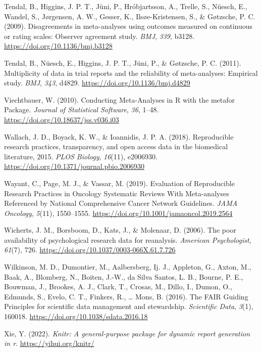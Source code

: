 \documentclass[
  ,apa7,floatsintext]{apa6}
\newlength{\cslhangindent}
\newlength{\cslentryspacingunit} %
\newenvironment{CSLReferences}[2] %
 {%
  \setlength{\parindent}{0pt}
  \ifodd #1
  \let\oldpar\par
  \def\par{\hangindent=\cslhangindent\oldpar}
  \fi
  \setlength{\parskip}{#2\cslentryspacingunit}
 }%
 {}
\begin{document}
\begin{CSLReferences}{1}{0}
\leavevmode{}%
Tendal, B., Higgins, J. P. T., Jüni, P., Hróbjartsson, A., Trelle, S., Nüesch, E., Wandel, S., Jørgensen, A. W., Gesser, K., Ilsøe-Kristensen, S., \& Gøtzsche, P. C. (2009). Disagreements in meta-analyses using outcomes measured on continuous or rating scales: Observer agreement study. \emph{BMJ}, \emph{339}, b3128. \url{https://doi.org/10.1136/bmj.b3128}

\leavevmode{}%
Tendal, B., Nüesch, E., Higgins, J. P. T., Jüni, P., \& Gøtzsche, P. C. (2011). Multiplicity of data in trial reports and the reliability of meta-analyses: Empirical study. \emph{BMJ}, \emph{343}, d4829. \url{https://doi.org/10.1136/bmj.d4829}

\leavevmode{}%
Viechtbauer, W. (2010). Conducting {Meta-Analyses} in {R} with the metafor {Package}. \emph{Journal of Statistical Software}, \emph{36}, 1--48. \url{https://doi.org/10.18637/jss.v036.i03}

\leavevmode{}%
Wallach, J. D., Boyack, K. W., \& Ioannidis, J. P. A. (2018). Reproducible research practices, transparency, and open access data in the biomedical literature, 2015. \emph{PLOS Biology}, \emph{16}(11), e2006930. \url{https://doi.org/10.1371/journal.pbio.2006930}

\leavevmode{}%
Wayant, C., Page, M. J., \& Vassar, M. (2019). Evaluation of {Reproducible} {Research} {Practices} in {Oncology} {Systematic} {Reviews} {With} {Meta}-analyses {Referenced} by {National} {Comprehensive} {Cancer} {Network} {Guidelines}. \emph{JAMA Oncology}, \emph{5}(11), 1550--1555. \url{https://doi.org/10.1001/jamaoncol.2019.2564}

\leavevmode{}%
Wicherts, J. M., Borsboom, D., Kats, J., \& Molenaar, D. (2006). The poor availability of psychological research data for reanalysis. \emph{American Psychologist}, \emph{61}(7), 726. \url{https://doi.org/10.1037/0003-066X.61.7.726}

\leavevmode{}%
Wilkinson, M. D., Dumontier, M., Aalbersberg, Ij. J., Appleton, G., Axton, M., Baak, A., Blomberg, N., Boiten, J.-W., da Silva Santos, L. B., Bourne, P. E., Bouwman, J., Brookes, A. J., Clark, T., Crosas, M., Dillo, I., Dumon, O., Edmunds, S., Evelo, C. T., Finkers, R., \ldots{} Mons, B. (2016). The {FAIR Guiding Principles} for scientific data management and stewardship. \emph{Scientific Data}, \emph{3}(1), 160018. \url{https://doi.org/10.1038/sdata.2016.18}

\leavevmode{}%
Xie, Y. (2022). \emph{Knitr: A general-purpose package for dynamic report generation in r}. \url{https://yihui.org/knitr/}

\end{CSLReferences}
\end{document}

